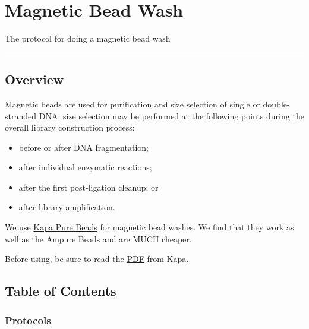 \documentclass[
  letterpaper,
  DIV=11,
  numbers=noendperiod]{scrreprt}
\begin{document}
\hypertarget{magnetic-bead-wash}{%
\chapter{Magnetic Bead Wash}\label{magnetic-bead-wash}}

The protocol for doing a magnetic bead wash

\begin{center}\rule{0.5\linewidth}{0.5pt}\end{center}

\hypertarget{overview-1}{%
\section*{\texorpdfstring{\textbf{Overview}}{Overview}}\label{overview-1}}

Magnetic beads are used for purification and size selection of single or
double-stranded DNA. size selection may be performed at the following
points during the overall library construction process:

\begin{itemize}
\item
  before or after DNA fragmentation;
\item
  after individual enzymatic reactions;
\item
  after the first post-ligation cleanup; or
\item
  after library amplification.
\end{itemize}

We use
\href{https://www.kapabiosystems.com/document/kapa-pure-beads-tds/?dl=1}{Kapa
Pure Beads} for magnetic bead washes. We find that they work as well as
the Ampure Beads and are MUCH cheaper.

Before using, be sure to read the
\href{https://www.kapabiosystems.com/document/kapa-pure-beads-tds/?dl=1}{PDF}
from Kapa.

\hypertarget{table-of-contents}{%
\section*{\texorpdfstring{\textbf{Table of
Contents}}{Table of Contents}}\label{table-of-contents}}

\hypertarget{protocols}{%
\subsection*{\texorpdfstring{\textbf{Protocols}}{Protocols}}\label{protocols}}
\end{document}
